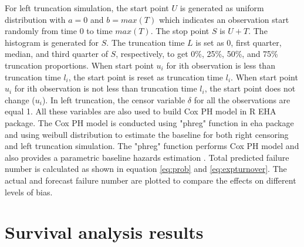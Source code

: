 For left truncation simulation, the start point $U$ is generated as uniform distribution with $a=0$ and $b=max(T)$ which indicates an observation start randomly from time 0 to time $max(T)$. The stop point $S$ is $U+T$. The histogram is generated for $S$. The truncation time $L$ is set as 0, first quarter, median, and third quarter of $S$, respectively, to get 0\%, 25\%, 50\%, and 75\% truncation proportions. When start point $u_i$ for ith observation is less than truncation time $l_i$, the start point is reset as truncation time $l_i$. When start point $u_i$ for ith observation is not less than truncation time $l_i$, the start point does not change ($u_i$). In left truncation, the censor variable $\delta$ for all the observations are equal 1. All these variables are also used to build Cox PH model in R EHA package. The Cox PH model is conducted using "phreg" function in eha package and using weibull distribution to estimate the baseline for both right censoring and left truncation simulation. The "phreg" function performs Cox PH model and also provides a parametric baseline hazards estimation \citep{brostrom2012}. Total predicted failure number is calculated as shown in equation \ref{eq:prob} and \ref {eq:expturnover}. The actual and forecast failure number are plotted to compare the effects on different levels of bias.




\section{Survival analysis results}
